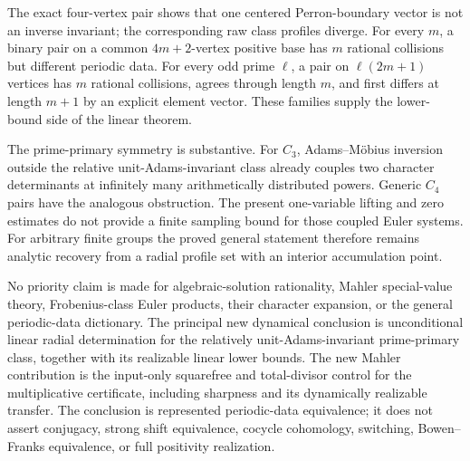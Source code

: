 The exact four-vertex pair shows that one centered Perron-boundary vector is
not an inverse invariant; the corresponding raw class profiles diverge.
For every \(m\), a binary pair on a common \(4m+2\)-vertex positive base has
\(m\) rational collisions but different periodic data.  For every odd prime
\(\ell\), a pair on \(\ell(2m+1)\) vertices has \(m\) rational collisions,
agrees through length \(m\), and first differs at length \(m+1\) by an
explicit element vector.  These families supply the lower-bound side of the
linear theorem.

The prime-primary symmetry is substantive.  For \(C_3\), Adams--M\"obius
inversion outside the relative unit-Adams-invariant class already couples
two character determinants at infinitely many arithmetically distributed
powers.  Generic \(C_4\) pairs have the analogous obstruction.  The present
one-variable lifting and zero estimates do not provide a finite sampling
bound for those coupled Euler systems.  For arbitrary finite groups the
proved general statement therefore remains analytic recovery from a radial
profile set with an interior accumulation point.

No priority claim is made for algebraic-solution rationality, Mahler
special-value theory, Frobenius-class Euler products, their character
expansion, or the general periodic-data dictionary.  The principal new
dynamical conclusion is unconditional linear radial determination for the
relatively unit-Adams-invariant prime-primary class, together with its
realizable linear lower bounds.  The new Mahler contribution is the
input-only squarefree and total-divisor control for the multiplicative
certificate, including sharpness and its dynamically realizable transfer.
The conclusion is represented periodic-data equivalence; it does not assert
conjugacy, strong shift equivalence, cocycle cohomology, switching,
Bowen--Franks equivalence, or full positivity realization.
